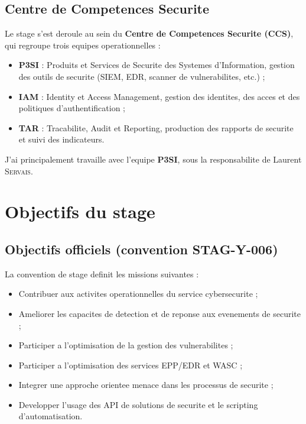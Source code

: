 \documentclass{rapport}
\begin{document}
\subsection{Centre de Competences Securite}

Le stage s'est deroule au sein du \textbf{Centre de Competences Securite
(CCS)}, qui regroupe trois equipes operationnelles :

\begin{itemize}
  \item \textbf{P3SI} : Produits et Services de Securite des Systemes
        d'Information, gestion des outils de securite (SIEM, EDR, scanner
        de vulnerabilites, etc.) ;
  \item \textbf{IAM} : Identity et Access Management, gestion des identites,
        des acces et des politiques d'authentification ;
  \item \textbf{TAR} : Tracabilite, Audit et Reporting, production des rapports
        de securite et suivi des indicateurs.
\end{itemize}

J'ai principalement travaille avec l'equipe \textbf{P3SI}, sous la
responsabilite de Laurent \textsc{Servais}.

\section{Objectifs du stage}

\subsection{Objectifs officiels (convention STAG-Y-006)}

La convention de stage definit les missions suivantes :

\begin{itemize}
  \item Contribuer aux activites operationnelles du service cybersecurite ;
  \item Ameliorer les capacites de detection et de reponse aux evenements de
        securite ;
  \item Participer a l'optimisation de la gestion des vulnerabilites ;
  \item Participer a l'optimisation des services EPP/EDR et WASC ;
  \item Integrer une approche orientee menace dans les processus de securite ;
  \item Developper l'usage des API de solutions de securite et le scripting
        d'automatisation.
\end{itemize}
\end{document}
